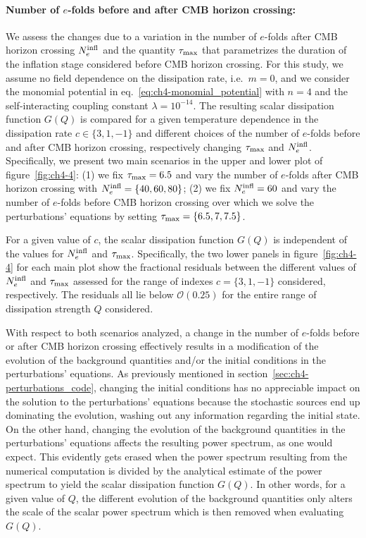 \paragraph{Number of $e$-folds before and after CMB horizon crossing:}
We assess the changes due to a variation in the number of $e$-folds after CMB horizon crossing $N_{e}^{\rm infl}$ and the quantity $\tau_{\rm{max}}$ that parametrizes the duration of the inflation stage considered before CMB horizon crossing. For this study, we assume no field dependence on the dissipation rate, i.e.\ $m=0$, and we consider the monomial potential in eq.~\eqref{eq:ch4-monomial_potential} with $n=4$ and the self-interacting coupling constant $\lambda=10^{-14}$. The resulting scalar dissipation function $G(Q)$ is compared for a given temperature dependence in the dissipation rate $c\in \{3, 1, -1\}$ and different choices of the number of $e$-folds before and after CMB horizon crossing, respectively changing $\tau_{\rm{max}}$ and $N_{e}^{\rm infl}$. Specifically, we present two main scenarios in the upper and lower plot of figure~\ref{fig:ch4-4}: (1) we fix $\tau_{\rm{max}}=6.5$ and vary the number of $e$-folds after CMB horizon crossing with $N_{e}^{\rm infl}=\{40,60,80\}$; (2) we fix $N_{e}^{\rm infl}=60$ and vary the number of $e$-folds before CMB horizon crossing over which we solve the perturbations' equations by setting $\tau_{\rm{max}}=\{6.5,7,7.5\}$.

For a given value of $c$, the scalar dissipation function $G(Q)$ is independent of the values for $N_e^{\rm infl}$ and $\tau_{\rm{max}}$. Specifically, the two lower panels in figure~\ref{fig:ch4-4} for each main plot show the fractional residuals between the different values of $N_e^{\rm{infl}}$ and $\tau_{\rm{max}}$ assessed for the range of indexes $c=\{3,1,-1\}$ considered, respectively. The residuals all lie below $\mathcal{O}(0.25)$ for the entire range of dissipation strength $Q$ considered. 

With respect to both scenarios analyzed, a change in the number of $e$-folds before or after CMB horizon crossing effectively results in a modification of the evolution of the background quantities and/or the initial conditions in the perturbations' equations. As previously mentioned in section~\ref{sec:ch4-perturbations_code}, changing the initial conditions has no appreciable impact on the solution to the perturbations' equations because the stochastic sources end up dominating the evolution, washing out any information regarding the initial state. On the other hand, changing the evolution of the background quantities in the perturbations' equations affects the resulting power spectrum, as one would expect. This evidently gets erased when the power spectrum resulting from the numerical computation is divided by the analytical estimate of the power spectrum to yield the scalar dissipation function $G(Q)$. In other words, for a given value of $Q$, the different evolution of the background quantities only alters the scale of the scalar power spectrum  which is then removed when evaluating $G(Q)$.


